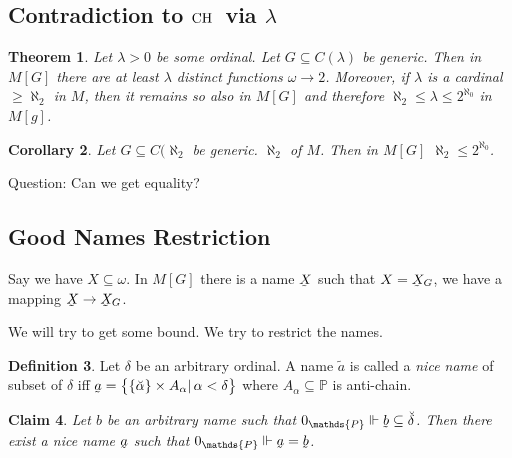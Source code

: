 \documentclass[11pt,pdftex,twoside,a4paper]{article}
\newcommand{\CH}{\ensuremath{\mathop{\rm CH}\nolimits}}
\newcommand{\dsP}{\ensuremath{\mathds{P}}}
\newcommand{\forces}{\ensuremath{\Vdash}}
\newcommand{\utilde}[1]{\ensuremath{\underaccent{\tilde}{#1}}}
\newtheorem{thm}{Theorem}[section]
\newtheorem{claim}[thm]{Claim}
\newtheorem{corollary}[thm]{Corollary}
\theoremstyle{definition}
\newtheorem{ldef}[thm]{Definition}
\begin{document}
\subsection{Contradiction to \CH\ via \(\lambda\)}

\begin{thm}
Let \(\lambda>0\) be some ordinal. Let \(G\subseteq C(\lambda)\) be generic.
Then in \(M[G]\) there are at least \(\lambda\)
distinct functions \(\omega\to 2\).
Moreover, if \(\lambda\) is a cardinal \(\geq \aleph_2\) in $M$,
then it remains so also in \(M[G]\) and therefore
\(\aleph_2 \leq \lambda \leq 2^{\aleph_0}\) in \(M[g]\).
\end{thm}

\begin{corollary}
Let \(G\subseteq C(\aleph_2\) be generic. \(\aleph_2\) of $M$.
Then in \(M[G]\) \(\aleph_2\leq 2^{\aleph_0}\).
\end{corollary}

Question: Can we get equality?

\subsection{Good Names Restriction}

Say we have \(X\subseteq\omega\). In \(M[G]\) there is a name \utilde{X}
such that \(X=\utilde{X}_G\), we have a mapping \(\utilde{X}\to\utilde{X}_G\).

We will try to get some bound.
We try to restrict the names.

\begin{ldef}
Let \(\delta\) be an arbitrary ordinal.
A name \(\tilde{a}\) is called a \emph{nice name} of subset of \(\delta\)
iff 
\(\utilde{a} = \bigl\{\{\breve{\alpha}\}\times A_\alpha|\, \alpha<\delta\bigr\}\)
where \(A_\alpha\subseteq \dsP\) is anti-chain.
\end{ldef}

\begin{claim}
Let $b$ be an arbitrary name such that 
\(0_\dsP\forces\utilde{b}\subseteq\breve{\delta}\).
Then there exist a nice name \utilde{a} such that
\(0_\dsP \forces \utilde{a} = \utilde{b}\).
\end{claim}
\end{document}
